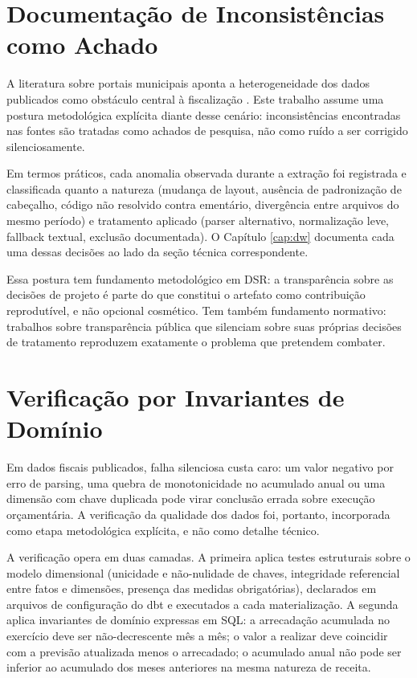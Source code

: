 \section{Documentação de Inconsistências como Achado}
\label{sec:inconsistencias}

A literatura sobre portais municipais aponta a heterogeneidade dos dados
publicados como obstáculo central à fiscalização
\cite{marco2022transparencia, melo2019proposta}. Este trabalho assume uma
postura metodológica explícita diante desse cenário: inconsistências
encontradas nas fontes são tratadas como achados de pesquisa, não como
ruído a ser corrigido silenciosamente.

Em termos práticos, cada anomalia observada durante a extração foi
registrada e classificada quanto a natureza (mudança de layout, ausência
de padronização de cabeçalho, código não resolvido contra ementário,
divergência entre arquivos do mesmo período) e tratamento aplicado
(parser alternativo, normalização leve, fallback textual, exclusão
documentada). O Capítulo \ref{cap:dw} documenta cada uma dessas decisões
ao lado da seção técnica correspondente.

Essa postura tem fundamento metodológico em DSR: a transparência sobre
as decisões de projeto é parte do que constitui o artefato como
contribuição reprodutível, e não opcional cosmético. Tem também
fundamento normativo: trabalhos sobre transparência pública que
silenciam sobre suas próprias decisões de tratamento reproduzem
exatamente o problema que pretendem combater.

\section{Verificação por Invariantes de Domínio}
\label{sec:invariantes}

Em dados fiscais publicados, falha silenciosa custa caro: um valor
negativo por erro de parsing, uma quebra de monotonicidade no acumulado
anual ou uma dimensão com chave duplicada pode virar conclusão errada
sobre execução orçamentária. A verificação da qualidade dos dados foi,
portanto, incorporada como etapa metodológica explícita, e não como
detalhe técnico.

A verificação opera em duas camadas. A primeira aplica testes
estruturais sobre o modelo dimensional (unicidade e não-nulidade de
chaves, integridade referencial entre fatos e dimensões, presença das
medidas obrigatórias), declarados em arquivos de configuração do dbt e
executados a cada materialização. A segunda aplica invariantes de
domínio expressas em SQL: a arrecadação acumulada no exercício deve ser
não-decrescente mês a mês; o valor a realizar deve coincidir com a
previsão atualizada menos o arrecadado; o acumulado anual não pode ser
inferior ao acumulado dos meses anteriores na mesma natureza de receita.

